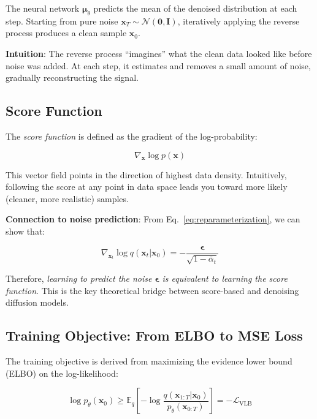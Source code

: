 \documentclass[conference]{IEEEtran}
\begin{document}
The neural network $\boldsymbol{\mu}_\theta$ predicts the mean of the denoised distribution at each step. Starting from pure noise $\mathbf{x}_T \sim \mathcal{N}(\mathbf{0}, \mathbf{I})$, iteratively applying the reverse process produces a clean sample $\mathbf{x}_0$.

\textbf{Intuition}: The reverse process ``imagines'' what the clean data looked like before noise was added. At each step, it estimates and removes a small amount of noise, gradually reconstructing the signal.

\subsection{Score Function}

The \textit{score function} is defined as the gradient of the log-probability:

\begin{equation}
    \nabla_{\mathbf{x}} \log p(\mathbf{x})
    \label{eq:score}
\end{equation}

This vector field points in the direction of highest data density. Intuitively, following the score at any point in data space leads you toward more likely (cleaner, more realistic) samples.

\textbf{Connection to noise prediction}: From Eq.~\ref{eq:reparameterization}, we can show that:

\begin{equation}
    \nabla_{\mathbf{x}_t} \log q(\mathbf{x}_t | \mathbf{x}_0) = -\frac{\boldsymbol{\epsilon}}{\sqrt{1 - \bar{\alpha}_t}}
    \label{eq:score_noise}
\end{equation}

Therefore, \textit{learning to predict the noise $\boldsymbol{\epsilon}$ is equivalent to learning the score function}. This is the key theoretical bridge between score-based and denoising diffusion models.

\subsection{Training Objective: From ELBO to MSE Loss}

The training objective is derived from maximizing the evidence lower bound (ELBO) on the log-likelihood:

\begin{equation}
    \log p_\theta(\mathbf{x}_0) \geq \mathbb{E}_q\left[-\log \frac{q(\mathbf{x}_{1:T}|\mathbf{x}_0)}{p_\theta(\mathbf{x}_{0:T})}\right] = -\mathcal{L}_{\text{VLB}}
    \label{eq:elbo}
\end{equation}
\end{document}
